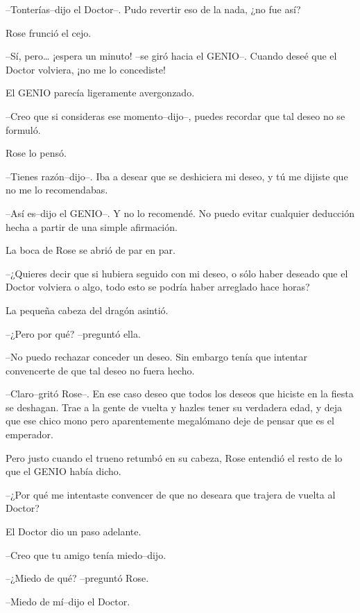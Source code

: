 --Tonterías--dijo el Doctor--. Pudo revertir eso de la nada, ¿no fue
así?

Rose frunció el cejo.

--Sí, pero\ldots{} ¡espera un minuto! --se giró hacia el GENIO--. Cuando
deseé que el Doctor volviera, ¡no me lo concediste!

El GENIO parecía ligeramente avergonzado.

--Creo que si consideras ese momento--dijo--, puedes recordar que tal
deseo no se formuló.

Rose lo pensó.

--Tienes razón--dijo--. Iba a desear que se deshiciera mi deseo, y tú me
dijiste que no me lo recomendabas.

--Así es--dijo el GENIO--. Y no lo recomendé. No puedo evitar cualquier
deducción hecha a partir de una simple afirmación.

La boca de Rose se abrió de par en par.

--¿Quieres decir que si hubiera seguido con mi deseo, o sólo haber
deseado que el Doctor volviera o algo, todo esto se podría haber
arreglado hace horas?

La pequeña cabeza del dragón asintió.

--¿Pero por qué? --preguntó ella.

--No puedo rechazar conceder un deseo. Sin embargo tenía que intentar
convencerte de que tal deseo no fuera hecho.

--Claro--gritó Rose--. En ese caso deseo que todos los deseos que
hiciste en la fiesta se deshagan. Trae a la gente de vuelta y hazles
tener su verdadera edad, y deja que ese chico mono pero aparentemente
megalómano deje de pensar que es el emperador.

Pero justo cuando el trueno retumbó en su cabeza, Rose entendió el resto
de lo que el GENIO había dicho.

--¿Por qué me intentaste convencer de que no deseara que trajera de
vuelta al Doctor?

El Doctor dio un paso adelante.

--Creo que tu amigo tenía miedo--dijo.

--¿Miedo de qué? --preguntó Rose.

--Miedo de mí--dijo el Doctor.
